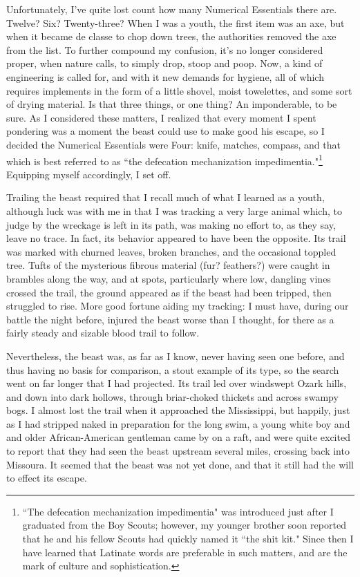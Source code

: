 \par
Unfortunately, I've quite lost count how many Numerical Essentials there are.  Twelve?  Six?  Twenty-three?  When I was a youth, the first item was an axe, but when it became de classe to chop down trees, the authorities removed the axe from the list.  To further compound my confusion, it's no longer considered proper, when nature calls, to simply drop, stoop and poop.  Now, a kind of engineering is called for,  and with it new demands for hygiene, all of which requires implements in the form of a little shovel, moist towelettes, and some sort of drying material.  Is that three things, or one thing?  An imponderable, to be sure.  As I considered these matters, I realized that every moment I spent pondering was a moment the beast could use to make good his escape, so I decided the Numerical Essentials were Four: knife, matches, compass, and that which is best referred to as ``the defecation mechanization impedimentia."\footnote{``The defecation mechanization impedimentia" was introduced just after I graduated from the Boy Scouts; however, my younger brother soon reported that he and his fellow Scouts had quickly named it ``the shit kit."  Since then I have learned that Latinate words are preferable in such matters, and are the mark of culture and sophistication.}  Equipping myself accordingly, I set off.
\par
Trailing the beast required that I recall much of what I learned as a youth, although luck was with me in that I was tracking a very large animal which, to judge by the wreckage is left in its path, was making no effort to, as they say, leave no trace.  In fact, its behavior appeared to have been the opposite.  Its trail was marked with churned leaves, broken branches, and the occasional toppled tree.  Tufts of the mysterious fibrous material (fur? feathers?) were caught in brambles along the way, and at spots, particularly where low, dangling vines crossed the trail, the ground appeared as if the beast had been tripped, then struggled to rise.  More good fortune aiding my tracking: I must have, during our battle the night before, injured the beast worse than I thought, for there as a fairly steady and sizable blood trail to follow.
\par
Nevertheless, the beast was, as far as I know, never having seen one before, and thus having no basis for comparison, a stout example of its type, so the search went on far longer that I had projected.  Its trail led over windswept Ozark hills, and down into dark hollows, through briar-choked thickets and across swampy bogs.  I almost lost the trail when it approached the Mississippi, but happily, just as I had stripped naked in preparation for the long swim, a young white boy and and older African-American gentleman came by on a raft, and were quite excited to report that they had seen the beast upstream several miles, crossing back into Missoura.  It seemed that the beast was not yet done, and that it still had the will to effect its escape.
